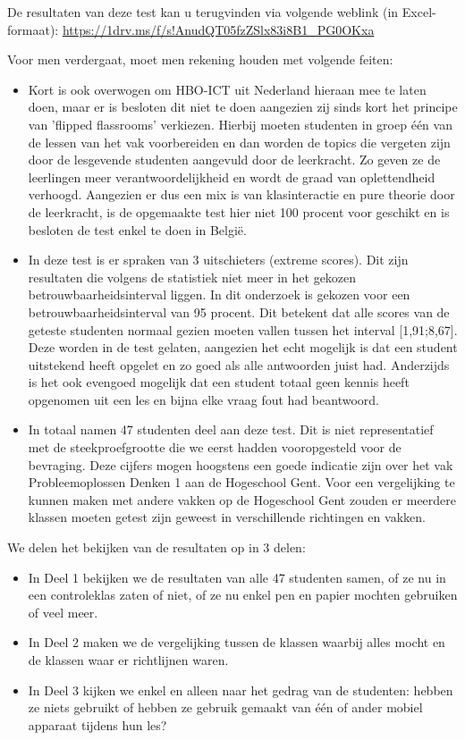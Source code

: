 De resultaten van deze test kan u terugvinden via volgende weblink (in Excel-formaat): \url{https://1drv.ms/f/s!AnudQT05fzZSlx83i8B1_PG0OKxa}

Voor men verdergaat, moet men rekening houden met volgende feiten:
\begin{itemize}
	\item Kort is ook overwogen om HBO-ICT uit Nederland hieraan mee te laten doen, maar er is besloten dit niet te doen aangezien zij sinds kort het principe van 'flipped flassrooms' verkiezen. Hierbij moeten studenten in groep één van de lessen van het vak voorbereiden en dan worden de topics die vergeten zijn door de lesgevende studenten aangevuld door de leerkracht. Zo geven ze de leerlingen meer verantwoordelijkheid en wordt de graad van oplettendheid verhoogd. Aangezien er dus een mix is van klasinteractie en pure theorie door de leerkracht, is de opgemaakte test hier niet 100 procent voor geschikt en is besloten de test enkel te doen in België.
	\item In deze test is er spraken van 3 uitschieters (extreme scores). Dit zijn resultaten die volgens de statistiek niet meer in het gekozen betrouwbaarheidsinterval liggen. In dit onderzoek is gekozen voor een betrouwbaarheidsinterval van 95 procent. Dit betekent dat alle scores van de geteste studenten normaal gezien moeten vallen tussen het interval [1,91;8,67]. Deze worden in de test gelaten, aangezien het echt mogelijk is dat een student uitstekend heeft opgelet en zo goed als alle antwoorden juist had. Anderzijds is het ook evengoed mogelijk dat een student totaal geen kennis heeft opgenomen uit een les en bijna elke vraag fout had beantwoord.
	\item In totaal namen 47 studenten deel aan deze test. Dit is niet representatief met de steekproefgrootte die we eerst hadden vooropgesteld voor de bevraging. Deze cijfers mogen hoogstens een goede indicatie zijn over het vak Probleemoplossen Denken 1 aan de Hogeschool Gent. Voor een vergelijking te kunnen maken met andere vakken op de Hogeschool Gent zouden er meerdere klassen moeten getest zijn geweest in verschillende richtingen en vakken.
\end{itemize}

We delen het bekijken van de resultaten op in 3 delen:

\begin{itemize}
	\item In Deel 1 bekijken we de resultaten van alle 47 studenten samen, of ze nu in een controleklas zaten of niet, of ze nu enkel pen en papier mochten gebruiken of veel meer.
	\item In Deel 2 maken we de vergelijking tussen de klassen waarbij alles mocht en de klassen waar er richtlijnen waren.
	\item In Deel 3 kijken we enkel en alleen naar het gedrag van de studenten: hebben ze niets gebruikt of hebben ze gebruik gemaakt van één of ander mobiel apparaat tijdens hun les?
\end{itemize}

